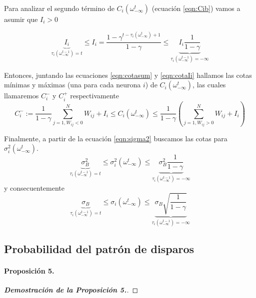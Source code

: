 Para analizar el segundo término de $C_i(\omega_{-\infty}^t)$ (ecuación \eqref{eqn:Cib}) vamos a asumir que $I_i > 0$

\begin{equation}
     \underbrace{I_i}_{\tau_i(\omega_{-\infty}^{t-1})=t} \leq
     I_i = \frac{1-\gamma^{t-\tau_i(\omega_{-\infty}^t)+1}}{1-\gamma} \leq
     \underbrace{I_i \frac{1}{1-\gamma}}_{\tau_i(\omega_{-\infty}^{t-1})=-\infty}
     \label{eqn:cotaIi}
\end{equation}

Entonces, juntando las ecuaciones \eqref{eqn:cotasum} y \eqref{eqn:cotaIi} hallamos las cotas mínimas y máximas (una para cada neurona $i$) de $C_i(\omega_{-\infty}^t)$, las cuales llamaremos $C_i^-$ y $C_i^+$ respectivamente
\begin{equation}
     C_i^- :=  \frac{1}{1-\gamma}\sum_{j=1, W_{ij}<0}^N W_{ij} + I_i 
     \leq C_i(\omega_{-\infty}^t) \leq
     \frac{1}{1-\gamma} \left( \sum_{j=1, W_{ij}>0}^N W_{ij} + I_i \right)
     \label{eqn:cotaCi}
\end{equation}

Finalmente, a partir de la ecuación \eqref{eqn:sigma2} buscamos las cotas para $\sigma_i^2(\omega_{-\infty}^t)$.
\begin{equation}
     \underbrace{\sigma_B^2}_{\tau_i(\omega_{-\infty}^{t-1})=t} \leq
     \sigma_i^2(\omega_{-\infty}^t) \leq
     \underbrace{\sigma_B^2 \frac{1}{1-\gamma}}_{\tau_i(\omega_{-\infty}^{t-1})=-\infty}
     \label{eqn:cotaSigma2}
\end{equation}
y consecuentemente
\begin{equation}
     \underbrace{\sigma_B}_{\tau_i(\omega_{-\infty}^{t-1})=t} \leq
     \sigma_i(\omega_{-\infty}^t) \leq
     \underbrace{\sigma_B \sqrt{\frac{1}{1-\gamma}}}_{\tau_i(\omega_{-\infty}^{t-1})=-\infty}
     \label{eqn:cotaSigma}
\end{equation}

\subsection{Probabilidad del patrón de disparos}

\paragraph{Proposición 5.}




\begin{proof}[\bf{Demostración de la Proposición 5.}]
\end{proof}






